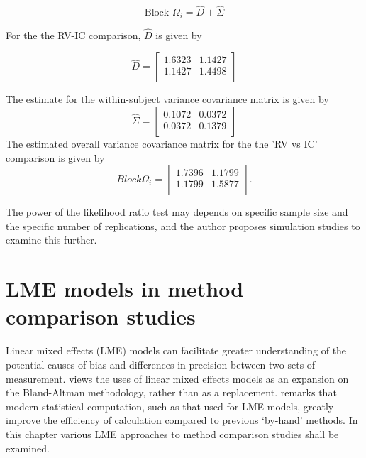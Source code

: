 \documentclass[12pt, a4paper]{report}
\theoremstyle{plain}
\theoremstyle{definition}
\theoremstyle{remark}
\begin{document}
\begin{equation}
\mbox{Block  }\Omega_{i} = \hat{D} + \hat{\Sigma}
\end{equation}

For the the RV-IC comparison, $\hat{D}$ is given by


\begin{equation}
\hat{D}= \left[ \begin{array}{cc}
1.6323 & 1.1427  \\
1.1427 & 1.4498 \\
\end{array} \right]
\end{equation}

The estimate for the within-subject variance covariance matrix is
given by
\begin{equation}
\hat{\Sigma}= \left[ \begin{array}{cc}
0.1072 & 0.0372  \\
0.0372 & 0.1379  \\
\end{array}\right]
\end{equation}
The estimated overall variance covariance matrix for the the 'RV
vs IC' comparison is given by
\begin{equation}
Block \Omega_{i}= \left[ \begin{array}{cc}
1.7396 & 1.1799  \\
1.1799 & 1.5877  \\
\end{array} \right].
\end{equation}

The power of the
likelihood ratio test may depends on specific sample size and the
specific number of  replications, and the author proposes
simulation studies to examine this further.



\section{LME models in method comparison studies}

Linear mixed effects (LME) models can facilitate greater
understanding of the potential causes of bias and differences in
precision between two sets of measurement. \citet{LaiShiao} views
the uses of linear mixed effects models as an expansion on the
Bland-Altman methodology, rather than as a replacement.
\citet{BXC2008} remarks that modern statistical computation, such
as that used for LME models, greatly improve the efficiency of
calculation compared to previous `by-hand' methods. In this
chapter various LME approaches to method comparison studies shall
be examined.
\end{document}
